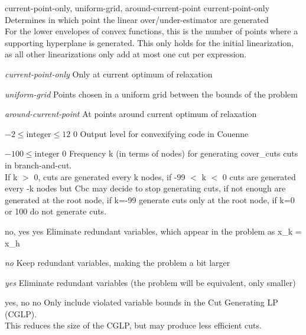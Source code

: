 %
{current-point-only, uniform-grid, around-current-point}%
{current-point-only}%
{Determines in which point the linear over/under-estimator are generated\\
For the lower envelopes of convex functions, this is the number of points where a supporting hyperplane is generated. This only holds for the initial linearization, as all other linearizations only add at most one cut per expression.}%
{\begin{list}{}{
\setlength{\parsep}{0em}
\setlength{\leftmargin}{3ex}
\setlength{\labelwidth}{1ex}
\setlength{\itemindent}{0ex}
\setlength{\topsep}{0pt}}
\item[\textit{current-point-only}] Only at current optimum of relaxation
\item[\textit{uniform-grid}] Points chosen in a uniform grid between the bounds of the problem
\item[\textit{around-current-point}] At points around current optimum of relaxation
\end{list}
}

%
{$-2\leq\textrm{integer}\leq12$}%
{$0$}%
{Output level for convexifying code in Couenne}%
{}

%
{$-100\leq\textrm{integer}$}%
{$0$}%
{Frequency k (in terms of nodes) for generating cover\_cuts cuts in branch-and-cut.\\
If k $>$ 0, cuts are generated every k nodes, if -99 $<$ k $<$ 0 cuts are generated every -k nodes but Cbc may decide to stop generating cuts, if not enough are generated at the root node, if k=-99 generate cuts only at the root node, if k=0 or 100 do not generate cuts.}%
{}

%
{no, yes}%
{yes}%
{Eliminate redundant variables, which appear in the problem as x\_k = x\_h}%
{\begin{list}{}{
\setlength{\parsep}{0em}
\setlength{\leftmargin}{3ex}
\setlength{\labelwidth}{1ex}
\setlength{\itemindent}{0ex}
\setlength{\topsep}{0pt}}
\item[\textit{no}] Keep redundant variables, making the problem a bit larger
\item[\textit{yes}] Eliminate redundant variables (the problem will be equivalent, only smaller)
\end{list}
}

%
{yes, no}%
{no}%
{Only include violated variable bounds in the Cut Generating LP (CGLP).\\
This reduces the size of the CGLP, but may produce less efficient cuts.}%
{}

